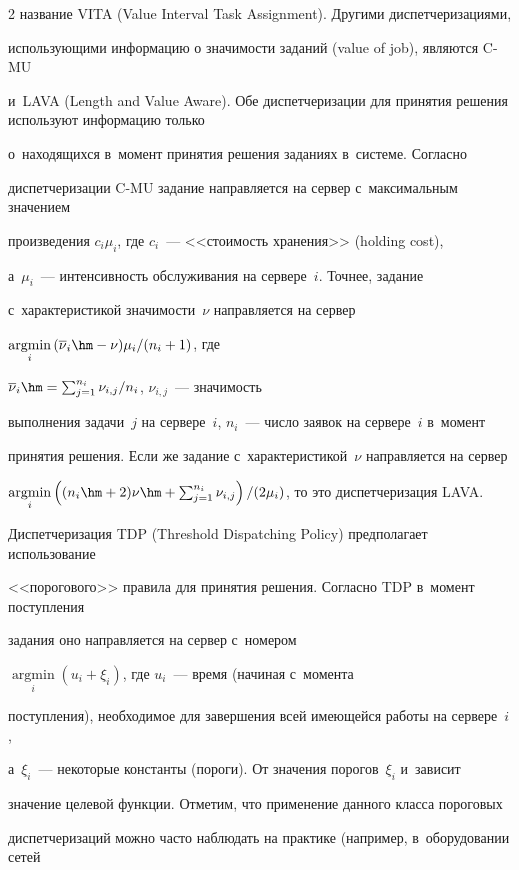 \begin{multicols}{2}
название VITA (Value Interval Task Assignment). Другими диспетчеризациями, 


использующими информацию о значимости заданий (value of job), являются C-MU 


и~LAVA  (Length and Value Aware). Обе диспетчеризации для принятия решения используют информацию только 


о~находящихся в~момент принятия решения заданиях в~сис\-те\-ме. Согласно 


диспетчеризации C-MU задание направляется на сервер с~максимальным значением 


произведения $c_i\mu_i$, где $c_i$~--- <<стоимость хранения>> (holding cost), 


а~$\mu_i$~--- интенсивность обслуживания на сервере~$i$. Точнее, задание 


с~характеристикой значимости~$\nu$ направляется на сервер 


$\mathop{\mathrm{argmin}}\limits_i\,(\overline{\nu}_i\hm-\nu)\mu_i/(n_i+1)$, где 


$\overline{\nu}_i\hm= \sum_{j=1}^{n_i} \nu_{i,j}/n_i$, $\nu_{i,j}$~--- значимость 


выполнения задачи~$j$ на сервере~$i$, $n_i$~--- число заявок на сервере~$i$ в~момент 


принятия решения. Если же задание с~характеристикой~$\nu$ направляется на сервер 


$\mathop{\mathrm{argmin}}\limits_i \left((n_i\hm+2)\nu\hm+\sum_{j=1}^{n_i}


\nu_{i,j}\right)/(2\mu_i)$, то это диспетчеризация LAVA.


    


    Диспетчеризация TDP (Threshold Dispatching Policy) предполагает использование 


<<порогового>> правила для принятия решения. Согласно TDP в~момент поступления 


задания оно направляется на сервер с~номером 


$\mathop{\mathrm{argmin}}\limits_i(u_i+\xi_i)$, где $u_i$~--- время (начиная с~момента 


поступления), необходимое для завершения всей имеющейся работы на сервере~$i$, 


а~$\xi_i$~--- некоторые константы (пороги). От значения порогов~$\xi_i$ и~зависит 


значение целевой функции. Отметим, что применение данного класса пороговых 


диспетчеризаций можно часто наблюдать на практике (например, в~оборудовании сетей 



\end{multicols}
